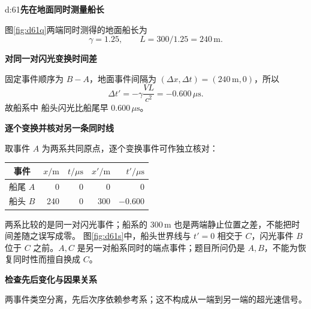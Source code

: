 \LectureAnswerSection

\begin{drillsolution}{d:61}\textbf{先在地面同时测量船长}\par\nobreak
图\ref{fig:d61q}两端同时测得的地面船长为
\[
 \gamma=1.25,\qquad L=300/1.25=240\,\mathrm m.
\]


\par\medskip{}\noindent\textbf{对同一对闪光变换时间差}\par\nobreak
固定事件顺序为 \(B-A\)，地面事件间隔为 \((\Delta x,\Delta t)=(240\,\mathrm m,0)\)，所以
\[
 \boxed{\Delta t'=-\gamma\frac{VL}{c^2}=-0.600\,\mu\mathrm s}.
\]
故船系中 \(\boxed{\text{船头闪光比船尾早 }0.600\,\mu\mathrm s}\)。


\par\medskip{}\noindent\textbf{逐个变换并核对另一条同时线}\par\nobreak
取事件 \(A\) 为两系共同原点，逐个变换事件可作独立核对：
\begin{center}\begin{tabular}{c|rr|rr}
事件&\(x/\mathrm m\)&\(t/\mu\mathrm s\)&\(x'/\mathrm m\)&\(t'/\mu\mathrm s\)\\\hline
船尾 \(A\)&0&0&0&0\\
船头 \(B\)&240&0&300&\(-0.600\)
\end{tabular}\end{center}
两系比较的是同一对闪光事件；船系的 \(300\,\mathrm m\) 也是两端静止位置之差，不能把时间差随之误写成零。
图\ref{fig:d61s}中，船头世界线与 $t'=0$ 相交于 $C$，闪光事件 $B$ 位于 $C$ 之前。$A,C$ 是另一对船系同时的端点事件；题目所问仍是 $A,B$，不能为恢复同时性而擅自换成 $C$。



\par\medskip{}\noindent\textbf{检查先后变化与因果关系}\par\nobreak
两事件类空分离，先后次序依赖参考系；这不构成从一端到另一端的超光速信号。
\end{drillsolution}

